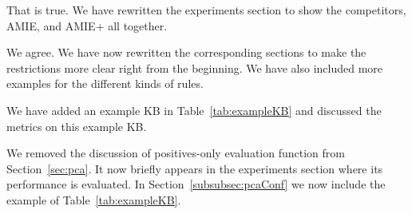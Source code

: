 That is true. We have rewritten the experiments section to show the competitors, AMIE, and AMIE+ all together.


We agree. We have now rewritten the corresponding sections to make the restrictions more clear right from the beginning. We have also included more examples for the different kinds of rules.


      We have added an example KB in  Table~\ref{tab:exampleKB} and discussed the metrics on this example KB.


      We removed the discussion of positives-only evaluation function from Section~\ref{sec:pca}.  It now briefly appears in the experiments section where its performance is evaluated.
      In Section~\ref{subsubsec:pcaConf} we now include the example of Table~\ref{tab:exampleKB}.

\twocolumn